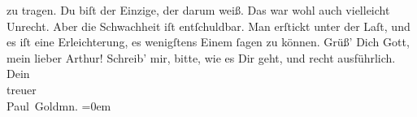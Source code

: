 \begin{ledgroupsized}[t]{13cm}
               zu tragen.\pend
           \pstart
           Du biſt der Einzige, der darum weiß. Das war wohl auch vielleicht Unrecht. Aber die
               Schwachheit iſt entſchuldbar. Man erſtickt unter der Laſt, und es iſt eine
               Erleichterung, es wenigſtens Einem ſagen zu können.\pend
           \pstart
           Grüß’ Dich Gott, mein lieber Arthur! Schreib’ mir, bitte, wie es Dir geht, und recht
               ausführlich.\pend
           \pstart
           Dein {\\[\baselineskip]}treuer {\\[\baselineskip]}\spacefill\mbox{Paul Goldmn.}\pend
           \leftskip=0em{}
         
         \endnumbering{}\end{ledgroupsized}  \newcommand{\dateiname}{L02705}\newcommand{\titel}{Paul Goldmann an Arthur Schnitzler, 25. 2. [1893]}\newcommand{\editorInnen}{Martin Anton Müller und Laura Untner}
      